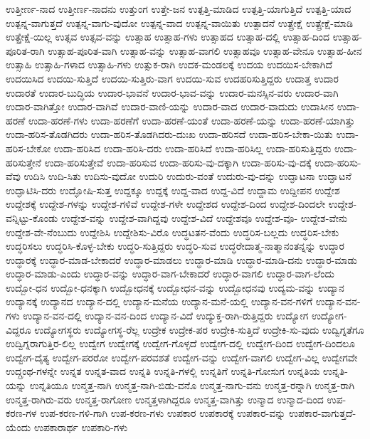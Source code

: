 {ಉತ್ತೀರ್ಣ-ನಾದ
ಉತ್ತೀರ್ಣ-ನಾದನು
ಉತ್ತುಂಗ
ಉತ್ತೇ-ಜನ
ಉತ್ಪತ್ತಿ-ಮಾಡಿದ
ಉತ್ಪತ್ತಿ-ಯಾಗುತ್ತಿದೆ
ಉತ್ಪತ್ತಿ-ಯಾದ
ಉತ್ಪನ್ನ-ವಾಗುತ್ತದೆ
ಉತ್ಪನ್ನ-ವಾಗು-ವುದೋ
ಉತ್ಪನ್ನ-ವಾದ
ಉತ್ಪನ್ನ-ವಾಯಿತು
ಉತ್ಪಾದನೆ
ಉತ್ಪ್ರೇಕ್ಷೆ
ಉತ್ಪ್ರೇಕ್ಷೆ-ಮಾಡಿ
ಉತ್ಪ್ರೇಕ್ಷೆ-ಯಿಲ್ಲ
ಉತ್ಸವ
ಉತ್ಸವ-ವನ್ನು
ಉತ್ಸಾಹ
ಉತ್ಸಾಹ-ಗಳು
ಉತ್ಸಾಹದ
ಉತ್ಸಾಹ-ದಲ್ಲಿ
ಉತ್ಸಾಹ-ದಿಂದ
ಉತ್ಸಾಹ-ಪೂರಿತ-ರಾಗಿ
ಉತ್ಸಾಹ-ಪೂರಿತ-ವಾಗಿ
ಉತ್ಸಾಹ-ವನ್ನು
ಉತ್ಸಾಹ-ವಾಗಲಿ
ಉತ್ಸಾಹವೂ
ಉತ್ಸಾಹ-ವೇನೂ
ಉತ್ಸಾಹ-ಹೀನ
ಉತ್ಸಾಹಿ
ಉತ್ಸಾಹಿ-ಗಳಾದ
ಉತ್ಸಾಹಿ-ಗಳು
ಉತ್ಸುಕ-ರಾಗಿ
ಉದಕ-ಮಂಡಲಕ್ಕೆ
ಉದಯ
ಉದಯಿಸ-ಬೇಕಾಗಿದೆ
ಉದಯಿಸಿದ
ಉದಯಿ-ಸುತ್ತಿದೆ
ಉದಯಿ-ಸುತ್ತಿರು-ವಾಗ
ಉದಯಿ-ಸುವ
ಉದಹರಿಸುತ್ತಿದ್ದರು
ಉದಾತ್ತ
ಉದಾರ
ಉದಾರತೆ
ಉದಾರ-ಬುದ್ಧಿಯ
ಉದಾರ-ಭಾವನೆ
ಉದಾರ-ಭಾವ-ವನ್ನು
ಉದಾರ-ಮನಸ್ಸಿನ-ವರು
ಉದಾರ-ವಾಗಿ
ಉದಾರ-ವಾಗಿತ್ತೋ
ಉದಾರ-ವಾಗಿವೆ
ಉದಾರ-ವಾಣಿ-ಯನ್ನು
ಉದಾರ-ವಾದ
ಉದಾರ-ವಾದುದು
ಉದಾಸೀನ
ಉದಾ-ಹರಣೆ
ಉದಾ-ಹರಣೆ-ಗಳು
ಉದಾ-ಹರಣೆಗೆ
ಉದಾ-ಹರಣೆ-ಯಂತೆ
ಉದಾ-ಹರಣೆ-ಯನ್ನು
ಉದಾ-ಹರಣೆ-ಯಾಗಿತ್ತು
ಉದಾ-ಹರಿಸ-ತೊಡಗಿದರು
ಉದಾ-ಹರಿಸ-ತೊಡಗಿದರು-ದುಃಖ
ಉದಾ-ಹರಿಸದೆ
ಉದಾ-ಹರಿಸ-ಬೇಕಾ-ಯಿತು
ಉದಾ-ಹರಿಸ-ಬೇಕೋ
ಉದಾ-ಹರಿಸಿದ
ಉದಾ-ಹರಿಸಿ-ದರು
ಉದಾ-ಹರಿಸಿದೆ
ಉದಾ-ಹರಿಸಿಲ್ಲ
ಉದಾ-ಹರಿಸುತ್ತಿದ್ದರು
ಉದಾ-ಹರಿಸುತ್ತೇನೆ
ಉದಾ-ಹರಿಸುತ್ತೇವೆ
ಉದಾ-ಹರಿಸುವ
ಉದಾ-ಹರಿಸು-ವು-ದಕ್ಕಾಗಿ
ಉದಾ-ಹರಿಸು-ವು-ದಕ್ಕೆ
ಉದಾ-ಹರಿಸು-ವೆವು
ಉದಿಸಿ
ಉದಿ-ಸಿತು
ಉದಿಸು-ವುದೋ
ಉದುರಿ
ಉದುರು-ವಂತೆ
ಉದುರು-ವು-ದನ್ನು
ಉದ್ಘಾಟನಾ
ಉದ್ಘಾಟನೆ
ಉದ್ಘಾಟಿಸಿ-ದರು
ಉದ್ಘೋಷಿ-ಸುತ್ತ
ಉದ್ದಕ್ಕೂ
ಉದ್ದಕ್ಕೆ
ಉದ್ದ-ವಾದ
ಉದ್ದ-ವಿದೆ
ಉದ್ದಾಮ
ಉದ್ದೀಪನ
ಉದ್ದೇಶ
ಉದ್ದೇಶಕ್ಕೆ
ಉದ್ದೇಶ-ಗಳನ್ನು
ಉದ್ದೇಶ-ಗಳಿವೆ
ಉದ್ದೇಶ-ಗಳೇ
ಉದ್ದೇಶದ
ಉದ್ದೇಶ-ದಿಂದ
ಉದ್ದೇಶ-ದಿಂದಲೇ
ಉದ್ದೇಶ-ವನ್ನಿಟ್ಟು-ಕೊಂಡು
ಉದ್ದೇಶ-ವನ್ನು
ಉದ್ದೇಶ-ವಾಗಿದ್ದವು
ಉದ್ದೇಶ-ವಿದೆ
ಉದ್ದೇಶವೂ
ಉದ್ದೇಶ-ವೂ-
ಉದ್ದೇಶ-ವೇನು
ಉದ್ದೇಶ-ವೇ-ನೆಂಬುದು
ಉದ್ದೇಶಿಸಿ
ಉದ್ದೇಶಿಸು-ವಿರೊ
ಉದ್ಧಟತನ-ವೆಂದು
ಉದ್ಧರಿಸ-ಬಲ್ಲದು
ಉದ್ಧರಿಸ-ಬೇಕು
ಉದ್ಧರಿಸಲು
ಉದ್ಧರಿಸಿ-ಕೊಳ್ಳ-ಬೇಕು
ಉದ್ಧರಿ-ಸುತ್ತಿದ್ದರು
ಉದ್ಧರಿ-ಸುವ
ಉದ್ಧರೇದಾತ್ಮ-ನಾತ್ಮಾನಂತನ್ನನ್ನು
ಉದ್ಧಾರ
ಉದ್ಧಾರಕ್ಕೆ
ಉದ್ಧಾರ-ಮಾಡ-ಬೇಕಾದರೆ
ಉದ್ಧಾರ-ಮಾಡಲು
ಉದ್ಧಾರ-ಮಾಡಿ
ಉದ್ಧಾರ-ಮಾಡಿ-ದನು
ಉದ್ಧಾರ-ಮಾಡು
ಉದ್ಧಾರ-ಮಾಡು-ಎಂದು
ಉದ್ಧಾರ-ವನ್ನು
ಉದ್ಧಾರ-ವಾಗ-ಬೇಕಾದರೆ
ಉದ್ಧಾರ-ವಾಗಲಿ
ಉದ್ಧಾರ-ವಾಗ-ಲೆಂದು
ಉದ್ಬೋ-ಧನ
ಉದ್ಬೋ-ಧನಕ್ಕಾಗಿ
ಉದ್ಬೋಧನಕ್ಕೆ
ಉದ್ಬೋಧನ-ವನ್ನು
ಉದ್ಬೋಧನವು
ಉದ್ಯಮ-ವನ್ನು
ಉದ್ಯಾನ
ಉದ್ಯಾನಕ್ಕೆ
ಉದ್ಯಾನದ
ಉದ್ಯಾನ-ದಲ್ಲಿ
ಉದ್ಯಾನ-ಮನೆಯ
ಉದ್ಯಾನ-ಮನೆ-ಯಲ್ಲಿ
ಉದ್ಯಾನ-ವನ-ಗಳಿಗೆ
ಉದ್ಯಾನ-ವನ-ಗಳು
ಉದ್ಯಾನ-ವನ-ದಲ್ಲಿ
ಉದ್ಯಾನ-ವನ-ದಿಂದ
ಉದ್ಯಾನ-ವಿದೆ
ಉದ್ಯುಕ್ತ-ರಾಗಿ-ರುತ್ತಿದ್ದರು
ಉದ್ಯೋಗ
ಉದ್ಯೋಗ-ವಿದ್ದರೂ
ಉದ್ಯೋಗಸ್ಥರು
ಉದ್ಯೋಗಸ್ಥ-ರೆಲ್ಲ
ಉದ್ರೇಕ
ಉದ್ರೇಕ-ಪರ
ಉದ್ರೇಕಿ-ಸುತ್ತಿದೆ
ಉದ್ರೇಕಿ-ಸು-ವುದು
ಉದ್ವಿಗ್ನತೆಗೂ
ಉದ್ವಿಗ್ನರಾಗುತ್ತಿರ-ಲಿಲ್ಲ
ಉದ್ವೇಗ
ಉದ್ವೇಗಕ್ಕೆ
ಉದ್ವೇಗ-ಗೊಳ್ಳದೆ
ಉದ್ವೇಗ-ದಲ್ಲಿ
ಉದ್ವೇಗ-ದಿಂದ
ಉದ್ವೇಗ-ದಿಂದಲೂ
ಉದ್ವೇಗ-ದೈತ್ಯ
ಉದ್ವೇಗ-ಪರರೋ
ಉದ್ವೇಗ-ಪರವಶತೆ
ಉದ್ವೇಗ-ವನ್ನು
ಉದ್ವೇಗ-ವಾಗಲಿ
ಉದ್ವೇಗ-ವಿಲ್ಲ
ಉದ್ವೇಗವೇ
ಉದ್ಗ್ರಂಥ-ಗಳನ್ನೇ
ಉನ್ನತ
ಉನ್ನತ-ವಾದ
ಉನ್ನತಿ
ಉನ್ನತಿ-ಗಳಲ್ಲಿ
ಉನ್ನತಿಗೆ
ಉನ್ನತಿ-ಗೋಸುಗ
ಉನ್ನತಿಯ
ಉನ್ನತಿ-ಯನ್ನು
ಉನ್ನತಿಯೂ
ಉನ್ಮತ್ತ-ನಾಗಿ
ಉನ್ಮತ್ತ-ನಾಗಿ-ಬಿಡು-ವನೊ
ಉನ್ಮತ್ತ-ನಾಗು-ವನು
ಉನ್ಮತ್ತ-ರನ್ನಾಗಿ
ಉನ್ಮತ್ತ-ರಾಗಿ
ಉನ್ಮತ್ತ-ರಾಗಿರು-ವರು
ಉನ್ಮತ್ತ-ರಾಗೋಣ
ಉನ್ಮತ್ತಳಾಗಿದ್ದರೂ
ಉನ್ಮತ್ತ-ವಾಗಿತ್ತು
ಉನ್ಮಾದ
ಉನ್ಮಾದ-ದಿಂದ
ಉಪ-ಕರಣ-ಗಳ
ಉಪ-ಕರಣ-ಗಳಿ-ಗಾಗಿ
ಉಪ-ಕರಣ-ಗಳು
ಉಪಕಾರ
ಉಪಕಾರಕ್ಕೆ
ಉಪಕಾರ-ವನ್ನು
ಉಪಕಾರ-ವಾಗುತ್ತದೆ-ಯೆಂದು
ಉಪಕಾರಾರ್ಥ
ಉಪಕಾರಿ-ಗಳು
}

